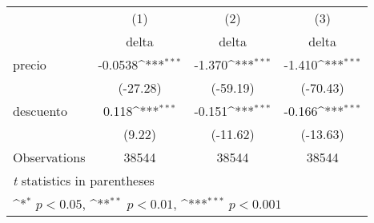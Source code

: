 {
\def\sym#1{\ifmmode^{#1}\else\(^{#1}\)\fi}
\begin{tabular}{l*{3}{c}}
\hline\hline
                    &\multicolumn{1}{c}{(1)}&\multicolumn{1}{c}{(2)}&\multicolumn{1}{c}{(3)}\\
                    &\multicolumn{1}{c}{delta}&\multicolumn{1}{c}{delta}&\multicolumn{1}{c}{delta}\\
\hline
precio              &     -0.0538\sym{***}&      -1.370\sym{***}&      -1.410\sym{***}\\
                    &    (-27.28)         &    (-59.19)         &    (-70.43)         \\
[1em]
descuento           &       0.118\sym{***}&      -0.151\sym{***}&      -0.166\sym{***}\\
                    &      (9.22)         &    (-11.62)         &    (-13.63)         \\
\hline
Observations        &       38544         &       38544         &       38544         \\
\hline\hline
\multicolumn{4}{l}{\footnotesize \textit{t} statistics in parentheses}\\
\multicolumn{4}{l}{\footnotesize \sym{*} \(p<0.05\), \sym{**} \(p<0.01\), \sym{***} \(p<0.001\)}\\
\end{tabular}
}
